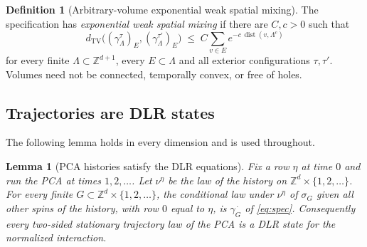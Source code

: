 \documentclass[11pt]{article}
\theoremstyle{plain}
\newtheorem{lemma}[theorem]{Lemma}
\theoremstyle{definition}
\newtheorem{definition}[theorem]{Definition}
\theoremstyle{remark}
\newcommand{\Z}{\mathbb{Z}}
\newcommand{\dtv}{d_{\mathrm{TV}}}
\newcommand{\Lam}{\Lambda}
\newcommand{\dist}{\operatorname{dist}}
\begin{document}
\begin{definition}[Arbitrary-volume exponential weak spatial mixing]
\label{def:wsm}
The specification has \emph{exponential weak spatial mixing} if there are $C,c>0$ such that
\begin{equation}
\dtv\bigl((\gamma^\tau_\Lam)_E,(\gamma^{\tau'}_\Lam)_E\bigr)\;\le\;C\sum_{v\in E}e^{-c\,\dist(v,\Lam^c)}
\label{eq:wsm}
\end{equation}
for every finite $\Lam\subset\Z^{d+1}$, every $E\subset\Lam$ and all exterior configurations $\tau,\tau'$. Volumes need not be connected, temporally convex, or free of holes.
\end{definition}

\subsection{Trajectories are DLR states}

The following lemma holds in every dimension and is used throughout.

\begin{lemma}[PCA histories satisfy the DLR equations]
\label{lem:halfspace}
Fix a row $\eta$ at time $0$ and run the PCA at times $1,2,\dots$. Let $\nu^\eta$ be the law of the history on $\Z^d\times\{1,2,\dots\}$. For every finite $G\subset\Z^d\times\{1,2,\dots\}$, the conditional law under $\nu^\eta$ of $\sigma_G$ given all other spins of the history, with row $0$ equal to $\eta$, is $\gamma^{\,\cdot}_G$ of \eqref{eq:spec}. Consequently every two-sided stationary trajectory law of the PCA is a DLR state for the normalized interaction.
\end{lemma}
\end{document}
